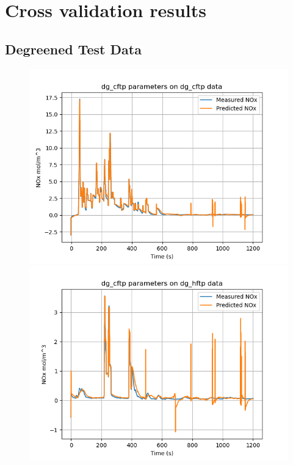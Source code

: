 \graphicspath{{Part3}}
\section{Cross validation results}

\subsection{Degreened Test Data}

\begin{figure}[H]
        \begin{minipage}{0.3\textwidth}
                \includegraphics[width = \textwidth]{./figs/figs_new_mdl/dg_cftp_dg_cftp.png}
        \end{minipage}
        \begin{minipage}{0.3\textwidth}
                \includegraphics[width = \textwidth]{./figs/figs_new_mdl/dg_cftp_dg_hftp.png}

\end{minipage}
\end{figure}
